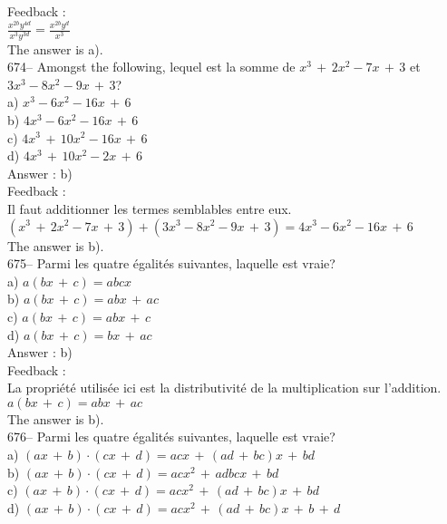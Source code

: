 ﻿\documentclass[letterpaper, 12pt]{article}
\begin{document}
Feedback : \\[2mm]
$\frac{x^{2b}y^{4d}}{x^{3}y^{3d}}=\frac{x^{2b}y^{d}}{x^{3}}$\\[2mm]
The answer is a).\\


674-- Amongst the following, lequel est la somme de
$x^{3}\,+\,2x^{2}-7x\,+\,3$ et $3x^{3}-8x^{2}-9x\,+\,3$?\\
a) $x^{3}-6x^{2}-16x\,+\,6$\\
b) $4x^{3}-6x^{2}-16x\,+\,6$\\
c) $4x^{3}\,+\,10x^{2}-16x\,+\,6$\\
d) $4x^{3}\,+\,10x^{2}-2x\,+\,6$\\

Answer : b)\\

Feedback : \\
Il faut additionner les termes semblables entre eux.\\
$\left( x^{3}\,+\,2x^{2}-7x\,+\,3\right)  + \left(
3x^{3}-8x^{2}-9x\,+\,3\right) =4x^{3}-6x^{2}-16x\,+\,6$\\
The answer is b).\\

675-- Parmi les quatre \'egalit\'es suivantes, laquelle est vraie?\\
a) $a\left( bx\,+\,c\right) =abcx$\\
b) $a\left( bx\,+\,c\right) =abx\,+\,ac$\\
c) $a\left( bx\,+\,c\right) =abx\,+\,c$\\
d) $a\left( bx\,+\,c\right) =bx\,+\,ac$\\

Answer : b)\\

Feedback : \\
La propri\'et\'e utilis\'ee ici est la distributivit\'e de la multiplication
sur l'addition.\\
$a\left( bx\,+\,c\right) =abx\,+\,ac$\\
The answer is b).\\

676-- Parmi les quatre \'egalit\'es suivantes, laquelle est vraie?\\
a) $\left( ax\,+\,b\right) \cdot\left( cx\,+\,d\right) =acx\,+\,\left(
ad\,+\,bc\right)x \,+\,bd$\\
b) $\left( ax\,+\,b\right) \cdot\left( cx\,+\,d\right) =acx^2\,+\,adbcx
\,+\,bd$\\
c) $\left( ax\,+\,b\right) \cdot\left( cx\,+\,d\right) =acx^2\,+\,\left(
ad\,+\,bc\right)x \,+\,bd$\\
d) $\left( ax\,+\,b\right) \cdot\left( cx\,+\,d\right) =acx^2\,+\,\left(
ad\,+\,bc\right)x \,+\,b\,+\,d$\\
\end{document}
